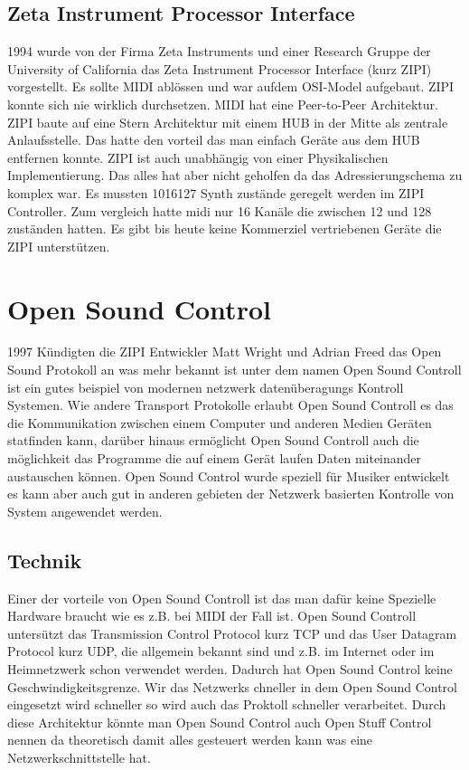 \documentclass[a4paper, 12pt]{article}
\begin{document}
\subsection {Zeta Instrument Processor Interface}
1994 wurde von der Firma Zeta Instruments und einer Research Gruppe der University of California das Zeta Instrument Processor Interface (kurz ZIPI) vorgestellt. Es sollte MIDI ablössen und war aufdem OSI-Model aufgebaut. ZIPI konnte sich nie wirklich durchsetzen. MIDI hat eine Peer-to-Peer Architektur. ZIPI baute auf eine Stern Architektur mit einem HUB in der Mitte als zentrale Anlaufsstelle. Das hatte den vorteil das man einfach Geräte aus dem HUB entfernen konnte. ZIPI ist auch unabhängig von einer Physikalischen Implementierung. Das alles hat aber nicht geholfen da das Adressierungschema zu komplex war. Es mussten 1016127 Synth zustände geregelt werden im ZIPI Controller. Zum vergleich hatte midi nur 16 Kanäle die zwischen 12 und 128 zuständen hatten.
Es gibt bis heute keine Kommerziel vertriebenen Geräte die ZIPI unterstützen.
\newpage
\section{Open Sound Control}
1997 Kündigten die ZIPI Entwickler Matt Wright und Adrian Freed das Open Sound Protokoll an was mehr bekannt ist unter dem namen Open Sound Controll ist ein gutes beispiel von modernen netzwerk datenüberagungs Kontroll Systemen. Wie andere Transport Protokolle erlaubt Open Sound Controll es das die Kommunikation zwischen einem Computer und anderen Medien Geräten statfinden kann, darüber hinaus ermöglicht Open Sound Controll auch die möglichkeit das Programme die auf einem Gerät laufen Daten miteinander austauschen können. Open Sound Control wurde speziell für Musiker entwickelt es kann aber auch gut in anderen gebieten der Netzwerk basierten Kontrolle von System angewendet werden.

\subsection{Technik}
Einer der vorteile von Open Sound Controll ist das man dafür keine Spezielle Hardware braucht wie es z.B. bei MIDI der Fall ist. Open Sound Controll untersützt das Transmission Control Protocol kurz TCP und das User Datagram Protocol kurz UDP, die allgemein bekannt sind und z.B. im Internet oder im Heimnetzwerk schon verwendet werden. Dadurch hat Open Sound Control keine Geschwindigkeitsgrenze. Wir das Netzwerks chneller in dem Open Sound Control eingesetzt wird schneller so wird auch das Proktoll schneller verarbeitet. Durch diese Architektur könnte man Open Sound Control auch Open Stuff Control nennen da theoretisch damit alles gesteuert werden kann was eine Netzwerkschnittstelle hat.
\end{document}
